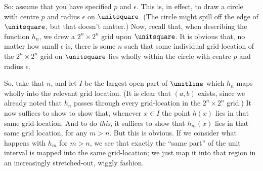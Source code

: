 \documentclass[../../../include/open-logic-section]{subfiles}
\begin{document}
So: assume that you have specified $p$ and $\epsilon$. This is, in
effect, to draw a circle with centre $p$ and radius $\epsilon$ on
$\unitsquare$. (The circle might spill off the edge of $\unitsquare$,
but that doesn't matter.) Now, recall that, when describing the
function $h_n$, we drew a $2^n \times 2^n$ grid upon $\unitsquare$. It
is obvious that, no matter how small $\epsilon$ is, there is some $n$
such that some individual grid-location of the $2^n \times 2^n$ grid
on $\unitsquare$ lies wholly within the circle with centre $p$ and
radius $\epsilon$. 

So, take that $n$, and let $I$ be the largest open part of $\unitline$
which $h_n$ maps wholly into the relevant grid location. (It is clear
that $(a,b)$ exists, since we already noted that $h_n$ passes through
every grid-location in the $2^n\times 2^n$ grid.) It now suffices to
show to show that, whenever $x \in I$ the point $h(x)$ lies in that
same grid-location. And to do \emph{this}, it suffices to show that
$h_m(x)$ lies in that same grid location, for any $m > n$. But this is
obvious. If we consider what happens with $h_m$ for $m > n$, we see
that exactly the ``same part'' of the unit interval is mapped
into the same grid-location; we just map it into that region in an
increasingly stretched-out, wiggly fashion. 
\end{document}
